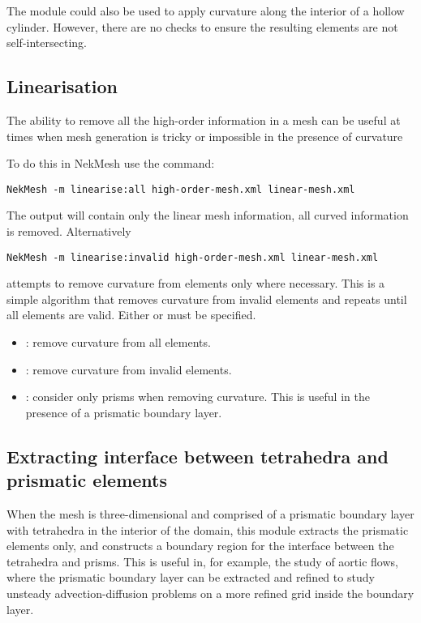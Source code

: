 \begin{notebox}
  The module could also be used to apply curvature along the interior of a
  hollow cylinder. However, there are no checks to ensure the resulting elements
  are not self-intersecting.
\end{notebox}

\subsection{Linearisation}

The ability to remove all the high-order information in a mesh can be useful at
times when mesh generation is tricky or impossible in the presence of curvature

To do this in NekMesh use the command:

\begin{lstlisting}[style=BashInputStyle]
  NekMesh -m linearise:all high-order-mesh.xml linear-mesh.xml
\end{lstlisting}

The output will contain only the linear mesh information, all curved information
is removed. Alternatively

\begin{lstlisting}[style=BashInputStyle]
  NekMesh -m linearise:invalid high-order-mesh.xml linear-mesh.xml
\end{lstlisting}

attempts to remove curvature from elements only where necessary. This is a
simple algorithm that removes curvature from invalid elements and repeats until
all elements are valid. Either  or  must be specified.

\begin{itemize}
  \item {}: remove curvature from all elements.
  \item {}: remove curvature from invalid elements.
  \item {}: consider only prisms when removing curvature. This is
  useful in the presence of a prismatic boundary layer.
\end{itemize}

\subsection{Extracting interface between tetrahedra and prismatic elements}

When the mesh is three-dimensional and comprised of a prismatic boundary layer
with tetrahedra in the interior of the domain, this module extracts the
prismatic elements only, and constructs a boundary region for the interface
between the tetrahedra and prisms. This is useful in, for example, the study of
aortic flows, where the prismatic boundary layer can be extracted and refined to
study unsteady advection-diffusion problems on a more refined grid inside the
boundary layer.

